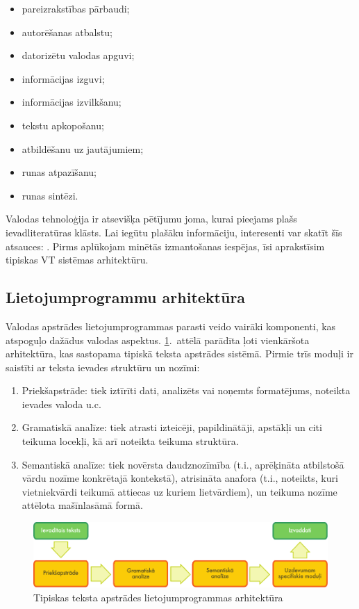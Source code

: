 \begin{multicols}{2}
\begin{itemize}
\item  pareizrakstības pārbaudi;
\item  autorēšanas atbalstu;
\item  datorizētu valodas apguvi;
\item  informācijas izguvi; 
\item  informācijas izvilkšanu;
\item  tekstu apkopošanu;
\item  atbildēšanu uz jautājumiem;
\item  runas atpazīšanu; 
\item  runas sintēzi. 
\end{itemize}

Valodas tehnoloģija ir atsevišķa pētījumu joma, kurai pieejams plašs ievadliteratūras klāsts. 
Lai iegūtu plašāku informāciju, interesenti var skatīt šīs atsauces: \cite{carstensen-etal1, jurafsky-martin01, manning-schuetze1, lt-world1, lt-survey1}.
Pirms aplūkojam minētās izmantošanas iespējas, īsi aprakstīsim tipiskas VT sistēmas arhitektūru.

\subsection{Lietojumprogrammu arhitektūra}

Valodas apstrādes lietojumprogrammas parasti veido vairāki komponenti, kas atspoguļo dažādus valodas aspektus.
\ref{fig:textprocessingarch_de}.~attēlā parādīta ļoti vienkāršota arhitektūra, kas sastopama tipiskā teksta apstrādes sistēmā.
Pirmie trīs moduļi ir saistīti ar teksta ievades struktūru un nozīmi:

\begin{enumerate}
\item  Priekšapstrāde: tiek iztīrīti dati, analizēts vai noņemts formatējums, noteikta ievades valoda u.c.
\item  Gramatiskā analīze: tiek atrasti izteicēji, papildinātāji, apstākļi un citi teikuma locekļi, kā arī noteikta teikuma struktūra.
\item  Semantiskā analīze: tiek novērsta daudznozīmība (t.i., aprēķināta atbilstošā vārdu nozīme konkrētajā kontekstā), atrisināta anafora (t.i., noteikts, kuri vietniekvārdi teikumā attiecas uz kuriem lietvārdiem), un teikuma nozīme attēlota mašīnlasāmā formā.
\end{enumerate}

\begin{figure}[htb]
  \center
  \includegraphics[width=\textwidth]{../_media/latvian/text_processing_app_architecture}
  \caption{Tipiskas teksta apstrādes lietojumprogrammas arhitektūra}
   \label{fig:textprocessingarch_de}
\end{figure}


\end{multicols}
